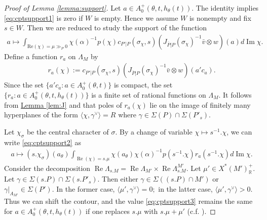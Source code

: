 \documentclass[10pt]{amsart}
\theoremstyle{definition}
\numberwithin{equation}{section}
\numberwithin{equation}{subsection}
\newcommand{\RR}{\mathbb{R}}
\renewcommand{\Im}{\mathop{\mathrm{Im}}}
\renewcommand{\Re}{\mathop{\mathrm{Re}}}
\begin{document}
\begin{proof}[Proof of Lemma \ref{lemma:support}]
Let $a\in A_0^+(\theta,t,h_\theta(t))$.  The identity implies  \eqref{eq:cptsupport1} is zero if $W$ is empty. Hence we assume $W$ is nonempty and fix $s\in W.$ Then we are reduced to study the support of the function
\begin{align}\label{eq:cptsupport2}
    a\mapsto \int_{\mathrm{{Re}}(\chi)= \mu\gg_P0} \chi(\alpha)^{-1}p(\chi)c_{P'|P}(\sigma_\chi,s)(J_{\overline{P}|P}(\sigma_\chi)^{-1}\bar{v}\otimes w)(a)d\Im\chi.
\end{align}
Define a function $r_a$ on $\Lambda_M$ by
\begin{align*}
    r_a(\chi):=c_{P'|P}(\sigma_\chi,s)(J_{\overline{P}|P}(\sigma_\chi)^{-1}\bar{v}\otimes w)(a'c_a).
\end{align*}
Since the set $\{ a'c_a:a\in A_0^+(\theta,t)\}$ is compact, the set $\{r_a:a\in  A_0^+(\theta,t,h_\theta(t))\}$ is a finite set of rational functions on $\Lambda_M$. It follows from  \hyperref[lem:J]{Lemma \ref{lem:J}} and \cite[Lemme 1.3.2]{Heiermann:HeckePlan} that poles of $r_a(\chi)$ lie on the image of finitely many hyperplanes of the form $\langle \chi,\gamma^\lor\rangle=R$ where $\gamma\in \Sigma(P)\cap \Sigma(P'_s).$ 

Let $\chi_\sigma$ be the central character of $\sigma$. By a change of variable $\chi\mapsto s^{-1}.\chi$,  we can write \eqref{eq:cptsupport2} as
\begin{align}\label{eq:cptsupport3}
    a\mapsto (s.\chi_{\sigma})(a_\theta)\int_{\Re(\chi)=s.\mu} \chi(a_\theta)\chi(\alpha)^{-1}p(s^{-1}.\chi)r_a(s^{-1}.\chi) d\Im\chi.
\end{align}
Consider the decomposition $\Re\Lambda_{s.M}=\Re\Lambda_{M'}\times\Re\Lambda^{M'}_{s. M}.$ Let $\mu'\in X^\ast(M')_\RR^+$. Let $\gamma\in \Sigma(s.P)\cap \Sigma(s. P'_s)$. Then either $\gamma\in \Sigma((s. P)\cap M')$ or $\gamma|_{A_{M'}}\in \Sigma(P').$ In the former case, $\langle \mu',\gamma^\lor\rangle=0;$ in the latter case, $\langle \mu',\gamma^\lor\rangle>0.$ Thus we can shift the contour, and the value \eqref{eq:cptsupport3} remains the same for $a\in A_0^+(\theta,t,h_\theta(t))$ if one replaces $s.\mu$ with $s.\mu+\mu'$ (c.f. \cite[\S1.2.2]{Heiermann:HeckePlan}).


\end{proof}
\end{document}
